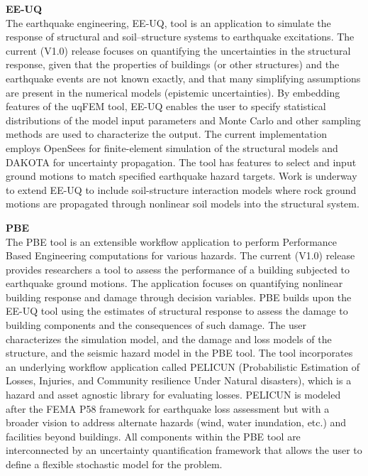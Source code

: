 \noindent\textbf{EE-UQ} \\The earthquake engineering, EE-UQ, tool is an application to simulate the response of structural and soil–structure systems to earthquake excitations. The current (V1.0) release focuses on quantifying the uncertainties in the structural response, given that the properties of buildings (or other structures) and the earthquake events are not known exactly, and that many simplifying assumptions are present in the numerical models (epistemic uncertainties). By embedding features of the uqFEM tool, EE-UQ enables the user to specify statistical distributions of the model input parameters and Monte Carlo and other sampling methods are used to characterize the output. The current implementation employs OpenSees for finite-element simulation of the structural models and DAKOTA for uncertainty propagation. The tool has features to select and input ground motions to match specified earthquake hazard targets. Work is underway to extend EE-UQ to include soil-structure interaction models where rock ground motions are propagated through nonlinear soil models into the structural system.
\newline

\noindent\textbf{PBE} \\The PBE tool is an extensible workflow application to perform Performance Based Engineering computations for various hazards. The current (V1.0) release provides researchers a tool to assess the performance of a building subjected to earthquake ground motions. The application focuses on quantifying nonlinear building response and damage through decision variables. PBE builds upon the EE-UQ tool using the estimates of structural response to assess the damage to building components and the consequences of such damage. The user characterizes the simulation model, and the damage and loss models of the structure, and the seismic hazard model in the PBE tool. The tool incorporates an underlying workflow application called PELICUN (Probabilistic Estimation of Losses, Injuries, and Community resilience Under Natural disasters), which is a hazard and asset agnostic library for evaluating losses. PELICUN is modeled after the FEMA P58 framework for earthquake loss assessment but with a broader vision to address alternate hazards (wind, water inundation, etc.) and facilities beyond buildings. All components within the PBE tool are interconnected by an uncertainty quantification framework that allows the user to define a flexible stochastic model for the problem.
\newline

